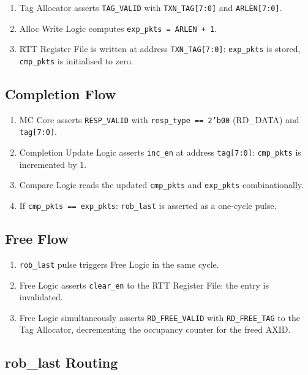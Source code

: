 \documentclass[11pt,a4paper]{article}
\begin{document}
\begin{enumerate}
  \item Tag Allocator asserts \texttt{TAG\_VALID} with \texttt{TXN\_TAG[7:0]}
        and \texttt{ARLEN[7:0]}.
  \item Alloc Write Logic computes \texttt{exp\_pkts = ARLEN + 1}.
  \item RTT Register File is written at address \texttt{TXN\_TAG[7:0]}:
        \texttt{exp\_pkts} is stored, \texttt{cmp\_pkts} is initialised
        to zero.
\end{enumerate}

\subsection{Completion Flow}

\begin{enumerate}
  \item MC Core asserts \texttt{RESP\_VALID} with \texttt{resp\_type == 2'b00}
        (RD\_DATA) and \texttt{tag[7:0]}.
  \item Completion Update Logic asserts \texttt{inc\_en} at address
        \texttt{tag[7:0]}: \texttt{cmp\_pkts} is incremented by 1.
  \item Compare Logic reads the updated \texttt{cmp\_pkts} and
        \texttt{exp\_pkts} combinationally.
  \item If \texttt{cmp\_pkts == exp\_pkts}: \texttt{rob\_last} is
        asserted as a one-cycle pulse.
\end{enumerate}

\subsection{Free Flow}

\begin{enumerate}
  \item \texttt{rob\_last} pulse triggers Free Logic in the same cycle.
  \item Free Logic asserts \texttt{clear\_en} to the RTT Register File:
        the entry is invalidated.
  \item Free Logic simultaneously asserts \texttt{RD\_FREE\_VALID} with
        \texttt{RD\_FREE\_TAG} to the Tag Allocator, decrementing the
        occupancy counter for the freed AXID.
\end{enumerate}

\subsection{rob\_last Routing}
\end{document}
